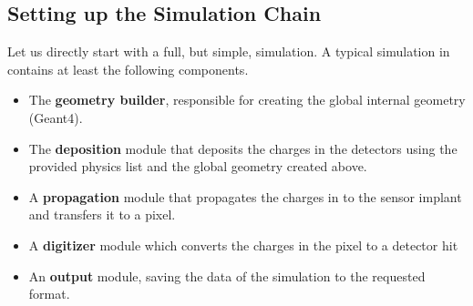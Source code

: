 \subsection{Setting up the Simulation Chain}
Let us directly start with a full, but simple, simulation. A typical simulation in \apsq contains at least the following components.
\begin{itemize}
\item The \textbf{geometry builder}, responsible for creating the global internal geometry (Geant4).
\item The \textbf{deposition} module that deposits the charges in the detectors using the provided physics list and the global geometry created above.
\item A \textbf{propagation} module that propagates the charges in to the sensor implant and transfers it to a pixel.
\item A \textbf{digitizer} module which converts the charges in the pixel to a detector hit
\item An \textbf{output} module, saving the data of the simulation to the requested format.
\end{itemize}

